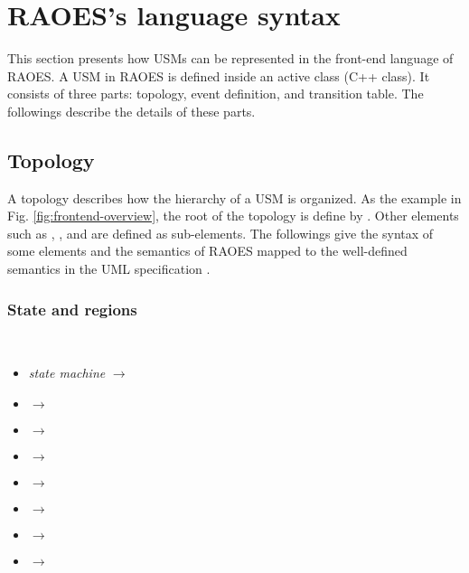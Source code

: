 \section{RAOES's language syntax}
\label{sec:syntax}
This section presents how USMs can be represented in the front-end language of RAOES.
A USM in RAOES is defined inside an active class (C++ class).
It consists of three parts: topology, event definition, and transition table.
The followings describe the details of these parts.
\subsection{Topology}
A topology describes how the hierarchy of a USM is organized.
As the example in Fig. \ref{fig:frontend-overview}, the root of the topology is define by .
Other elements such as , , and  are defined as sub-elements.
The followings give the syntax of some elements and the semantics of RAOES mapped to the well-defined semantics in the UML specification \cite{OMG2015}.

\subsubsection{State and regions} ~\\
\begin{itemize}[\footnotesize]
\item \textit{state machine} $\rightarrow$  

\item {} $\rightarrow$  

\item {} $\rightarrow$ 

\item {} $\rightarrow$  

\item {} $\rightarrow$ 

\item {} $\rightarrow$ 

\item {} $\rightarrow$ 

\item {} $\rightarrow$ 
\end{itemize}

